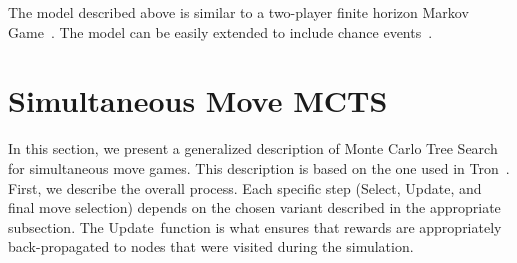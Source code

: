 \documentclass[conference]{IEEEtran}
\newcommand{\cT}{\mathcal{T}}
\newcommand{\ie}{{\it i.e.,}~}
\begin{document}


The model described above is similar to a two-player finite horizon Markov Game~\cite{Littman94markovgames}.
The model can be easily extended to include chance events~\cite{Lanctot13Goofspiel}. 

\section{Simultaneous Move MCTS}
\label{sec:smmcts}

\newcommand{\SMMCTS}{{\sc SM-MCTS}}
\newcommand{\ExpReq}{{\sc ExpansionRequired}}
\newcommand{\Update}{{\sc Update}}
\newcommand{\Select}{{\sc Select}}
\newcommand{\Playout}{{\sc Playout}}
\newcommand{\Max}{\text{Max}}
\newcommand{\Min}{\text{Min}}


In this section, we present a generalized description of Monte Carlo Tree Search for simultaneous move games. This 
description is based on the one used in Tron~\cite{Perick12Comparison}. First, we describe the overall process. 
Each specific step (\Select, \Update, and final move selection) depends on the chosen variant described in the 
appropriate subsection. The \Update~function is what ensures that rewards are appropriately back-propagated 
to nodes that were visited during the simulation. 
\end{document}

